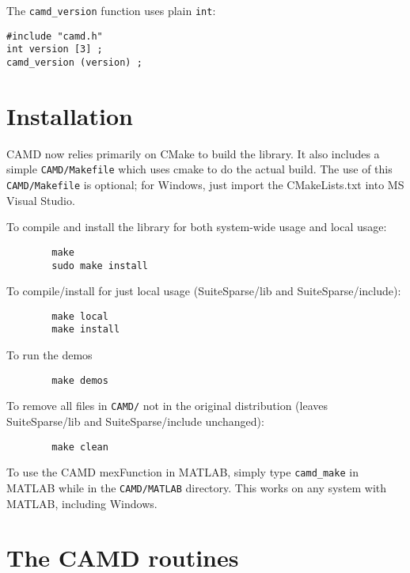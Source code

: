 \documentclass[11pt]{article}
\begin{document}
The \verb'camd_version' function uses plain \verb'int':

{\footnotesize
\begin{verbatim}
#include "camd.h"
int version [3] ;
camd_version (version) ;
\end{verbatim}
}

\section{Installation}
\label{Install}

CAMD now relies primarily on CMake to build the library.  It also includes
a simple \verb'CAMD/Makefile' which uses cmake to do the actual build.
The use of this \verb'CAMD/Makefile' is optional; for Windows, just import
the CMakeLists.txt into MS Visual Studio.

To compile and install the library for both system-wide usage and local
usage:

    \begin{verbatim}
        make
        sudo make install
    \end{verbatim}

To compile/install for just local usage (SuiteSparse/lib and
SuiteSparse/include):

    \begin{verbatim}
        make local
        make install
    \end{verbatim}

To run the demos

    \begin{verbatim}
        make demos
    \end{verbatim}

To remove all files in \verb'CAMD/' not in the original distribution (leaves
SuiteSparse/lib and SuiteSparse/include unchanged):

    \begin{verbatim}
        make clean
    \end{verbatim}

To use the CAMD mexFunction in MATLAB, simply type {\tt camd\_make} in MATLAB
while in the {\tt CAMD/MATLAB} directory.  This works on any system with MATLAB,
including Windows.

\newpage
\section{The CAMD routines}
\label{Primary}
\end{document}
